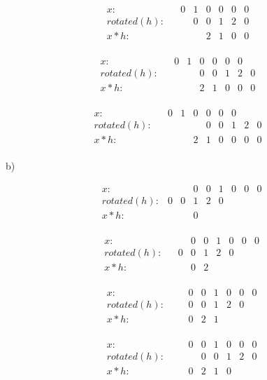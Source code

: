 \documentclass[11pt]{article}
\begin{document}
\[
\begin{array}{ccccccccccc}
x:  & & 0 & 1 & 0 & 0 & 0 & 0  \\
rotated(h):   &  &  & 0 & 0 & 1 & 2 &0 \\
x*h:  & & & & 2 & 1 & 0 & 0 &   \\
\end{array}
\]

\[
\begin{array}{ccccccccccc}
x:  & & 0 & 1 & 0 & 0 & 0 & 0  \\
rotated(h):   &  &  &  & 0 & 0 & 1 & 2 &0\\
x*h:  & & & & 2 & 1 & 0 & 0 & 0 &  \\
\end{array}
\]

\[
\begin{array}{ccccccccccc}
x:  & & 0 & 1 & 0 & 0 & 0 & 0  \\
rotated(h):  &  &  &  &  & 0 & 0 & 1 & 2 & 0 \\
x*h:  & & & & 2 & 1 & 0 & 0 & 0 & 0 &  \\
\end{array}
\]

b) 

\[
\begin{array}{ccccccccccc}
x: & & & 0 & 0 & 1 &0 &0 &0  \\
rotated(h): & 0 & 0 & 1 & 2 & 0 &  \\
x*h: & & & 0 & & & & &  \\
\end{array}
\]

\[
\begin{array}{ccccccccccc}
x: & & & 0 & 0 & 1 &0 &0 &0  \\
rotated(h): &  & 0 & 0 & 1 & 2 &0  \\
x*h: & & & 0 &2 & & & &  \\
\end{array}
\]

\[
\begin{array}{ccccccccccc}
x: & & & 0 & 0 & 1 &0 &0 &0  \\
rotated(h): &  &  & 0 & 0 &1 &2 &0  \\
x*h: & & & 0 &2 &1 & & &  \\
\end{array}
\]

\[
\begin{array}{ccccccccccc}
x: & & & 0 & 0 & 1 &0 &0 &0  \\
rotated(h): &  &  & & 0 &0 &1 &2 &0  \\
x*h: & & & 0 &2 &1 & 0& &  \\
\end{array}
\]
\end{document}
